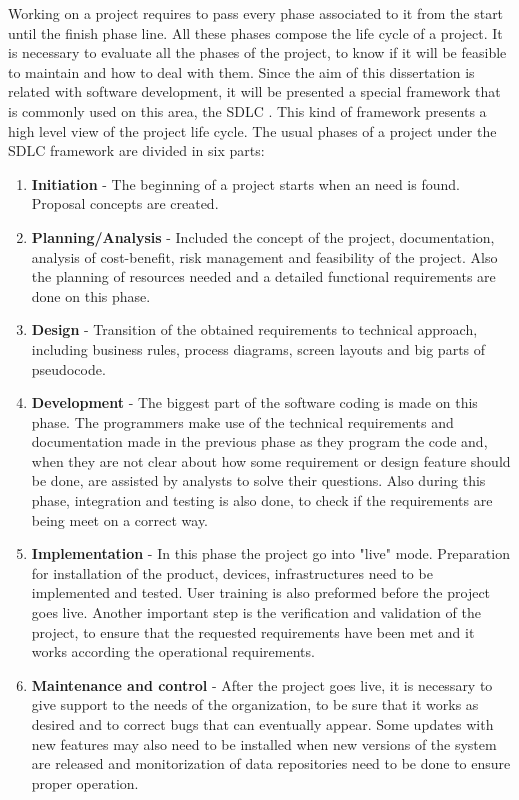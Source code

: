 \documentclass[mim_thesis.tex]{subfiles}
\begin{document}
Working on a project requires to pass every phase associated to it from the start until the finish phase line. All these phases compose the life cycle of a project. It is necessary to evaluate all the phases of the project, to know if it will be feasible to maintain and how to deal with them. Since the aim of this dissertation is related with software development, it will be presented a special framework that is commonly used on this area, the \ac{SDLC} \citep{wilcox2014software}. This kind of framework presents a high level view of the project life cycle. The usual phases of a project under the SDLC framework are divided in six parts:
\begin{enumerate}
\item \textbf{Initiation} - The beginning of a project starts when an need is found. Proposal concepts are created.
\item \textbf{Planning/Analysis} - Included the concept of the project, documentation, analysis of cost-benefit, risk management and feasibility of the project. Also the planning of resources needed and a detailed functional requirements are done on this phase. 
\item \textbf{Design} - Transition of the obtained requirements to technical approach, including business rules, process diagrams, screen layouts and big parts of pseudocode.  
\item \textbf{Development} - The biggest part of the software coding is made on this phase. The programmers make use of the technical requirements and documentation made in the previous phase as they program the code and, when they are not clear about how some requirement or design feature should be done, are assisted by analysts to solve their questions. Also during this phase, integration and testing is also done, to check if the requirements are being meet on a correct way. 
\item \textbf{Implementation} - In this phase the project go into "live" mode. Preparation for installation of the product, devices, infrastructures need to be implemented and tested. User training is also preformed before the project goes live. Another important step is the verification and validation of the project, to ensure that the requested requirements have been met and it works according the operational requirements.  
\item \textbf{Maintenance and control} - After the project goes live, it is necessary to give support to the needs of the organization, to be sure that it works as desired and to correct bugs that can eventually appear. Some updates with new features may also need to be installed when new versions of the system are released and monitorization of data repositories need to be done to ensure proper operation.
\end{enumerate}
\end{document}
